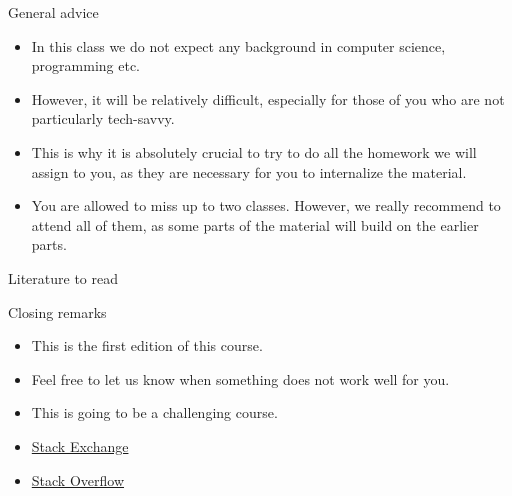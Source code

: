 \begin{frame}{General advice}
\begin{itemize}
    \item In this class we do not expect any background in computer science,
    programming etc.
    \item However, it will be relatively difficult, especially for those of you
    who are not particularly tech-savvy.
    \item This is why it is absolutely crucial to try to do all the homework
    we will assign to you, as they are necessary for you to internalize
    the material.
    \item You are allowed to miss up to two classes. However, we really recommend
    to attend all of them, as some parts of the material will build on the
    earlier parts.
\end{itemize}
\end{frame}

\begin{frame}{Literature to read}
\nocite{*}
\AtNextBibliography{\footnotesize}
\printbibliography
\end{frame}

\begin{frame}{Closing remarks}
\begin{itemize}
    \item This is the first edition of this course.
    \item Feel free to let us know when something does not work well for you.
    \item This is going to be a challenging course.
    \item \href{www.stackexchange.com}{Stack Exchange}
    \item \href{www.stackoverflow.com}{Stack Overflow}
\end{itemize}
\end{frame}
